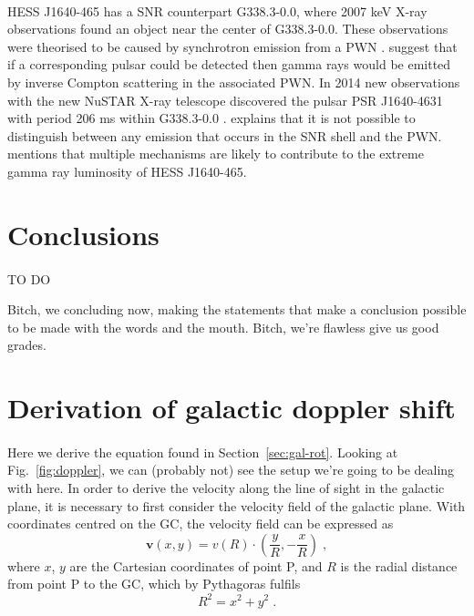 \documentclass[a4paper, titlepage, oneside]{article}
\begin{document}
\begin{multicols}{2}
\paragraph{}
HESS J1640-465 has a SNR counterpart G338.3-0.0, where 2007 keV X-ray observations found an object near the center of G338.3-0.0. These observations were theorised to be caused by synchrotron emission from a PWN \parencite{Funk:2007}. \textcite{Funk:2007} suggest that if a corresponding pulsar could be detected then gamma rays would be emitted by inverse Compton scattering in the associated PWN. In 2014 new observations with the new NuSTAR X-ray telescope discovered the pulsar PSR J1640-4631 with period 206 ms within G338.3-0.0 \parencite{Gotthelf:2014}. \textcite{Gotthelf:2014} explains that it is not possible to distinguish between any emission that occurs in the SNR shell and the PWN. \textcite{Gotthelf:2014} mentions that multiple mechanisms are likely to contribute to the extreme gamma ray luminosity of HESS J1640-465.

\section{Conclusions} %
\paragraph{}
TO DO

Bitch, we concluding now, making the statements that make a conclusion possible to be made with the words and the mouth. Bitch, we're flawless give us good grades.
\end{multicols}

\printbibliography[heading = bibintoc] %

\newpage

\appendix

\section{Derivation of galactic doppler shift}
\label{app:doppler}
\paragraph{}
Here we derive the equation found in Section~\ref{sec:gal-rot}. Looking at Fig.~\ref{fig:doppler}, we can (probably not) see the setup we're going to be dealing with here. In order to derive the velocity along the line of sight in the galactic plane, it is necessary to first consider the velocity field of the galactic plane. With coordinates centred on the GC, the velocity field can be expressed as
\begin{equation}
  \label{eq:vel-field}
  \mathbf{v}(x,y)=v(R)\cdot\!\left(\frac{y}{R},-\frac{x}{R}\right)\;,
\end{equation}
where \(x\), \(y\) are the Cartesian coordinates of point P, and \(R\) is the radial distance from point P to the GC, which by Pythagoras fulfils
\begin{equation}
  R^2=x^2+y^2\;.
\end{equation}
\end{document}
